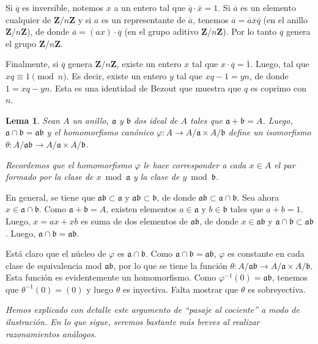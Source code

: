 \documentclass[bibtotoc,leqno,spanish]{amsbook}
\newcommand{\ZZ}{\mathbf{Z}}
\newcommand{\idl}[1]{\mathfrak{#1}}
\newcommand{\oline}[1]{\overline{#1}}
\renewcommand{\to}[1][]{\xrightarrow{#1}}
\numberwithin{equation}{section}
\newenvironment{comm}%
	{\begin{list}{}{\setlength{\leftmargin}{2\parindent}\setlength{\topsep}{\baselineskip}}\item\itshape}
	{\end{list}}
\theoremstyle{note}
\theoremstyle{note}
\newtheorem{lemma}{Lema}
\theoremstyle{rem}
\numberwithin{theorem}{section}
\numberwithin{proposition}{section}
\numberwithin{definition}{section}
\numberwithin{lemma}{section}
\numberwithin{corollary}{section}
\numberwithin{example}{section}
\numberwithin{footnote}{section}%
\begin{document}
Si $\oline q$ es inversible, notemos $x$ a un entero tal que $\oline q\cdot\oline x = 1$.
Si $\oline a$ es un elemento cualquier de $\ZZ/n\ZZ$ y si $a$ es un representante de $\oline a$,
tenemos $\oline a = \oline a\oline x\oline q$ (en el anillo $\ZZ/n\ZZ$), de donde
$\oline a = (ax)\cdot\oline q$ (en el grupo aditivo $\ZZ/n\ZZ$). Por lo tanto $\oline q$
genera el grupo $\ZZ/n\ZZ$.

Finalmente, si $\oline q$ genera $\ZZ/n\ZZ$, existe un entero
$x$ tal que $x\cdot\oline q = \oline 1$. Luego, tal que $xq\equiv 1\pmod n$. Es decir,
existe un entero $y$ tal que $xq-1=yn$, de donde $1 = xq-yn$. Esta es una identidad de Bezout
que muestra que $q$ es coprimo con $n$.

\begin{lemma}\label{lem1.3.1}
Sean $A$ un anillo, $\idl{a}$ y $\idl{b}$ dos ideal de $A$ tales que $\idl{a}+\idl{b}=A$.
Luego, $\idl{a}\cap\idl{b} = \idl{a}\idl{b}$ y el homomorfismo can\'onico
$\varphi:A\to A/\idl{a}\times A/\idl{b}$ define un isomorfismo $\theta:A/\idl{a}\idl{b}\to A/\idl{a}\times
A/\idl{b}$.
\end{lemma}

\begin{comm}
Recordemos que el homomorfismo $\varphi$ le hace corresponder a cada $x\in A$ el par formado
por la clase de $x\bmod\idl{a}$ y la clase de $y\bmod\idl{b}$.
\end{comm}

En general, se tiene que $\idl{a}\idl{b}\subset\idl{a}$ y $\idl{a}\idl{b}\subset\idl{b}$, de
donde $\idl{a}\idl{b}\subset\idl{a}\cap\idl{b}$. Sea ahora $x\in\idl{a}\cap\idl{b}$.
Como $\idl{a}+\idl{b}=A$, existen elementos $a\in\idl{a}$ y $b\in\idl{b}$ tales
que $a+b=1$. Luego, $x = ax+xb$ es suma de dos elementos de $\idl{a}\idl{b}$, de donde
$x\in\idl{a}\idl{b}$ y $\idl{a}\cap\idl{b}\subset\idl{a}\idl{b}$. Luego,
$\idl{a}\cap\idl{b} = \idl{a}\idl{b}$.

Est\'a claro que el n\'ucleo de $\varphi$ es $\idl{a}\cap\idl{b}$. Como $\idl{a}\cap\idl{b}
=\idl{a}\idl{b}$, $\varphi$ es constante en cada clase de equivalencia mod $\idl{a}\idl{b}$,
por lo que se tiene la funci\'on $\theta : A/\idl{a}\idl{b}\to A/\idl{a}\times A/\idl{b}$.
Esta funci\'on es evidentemente un homomorfismo. Como $\varphi^{-1}(0) = \idl{a}\idl{b}$,
tenemos que $\theta^{-1}(0) = (0)$ y luego $\theta$ es inyectiva. Falta mostrar que $\theta$
es sobreyectiva.

\begin{comm}
Hemos explicado con detalle este argumento de ``pasaje al cociente'' a modo de ilustraci\'on.
En lo que sigue, seremos bastante m\'as breves al realizar razonamientos an\'alogos.
\end{comm}
\end{document}
